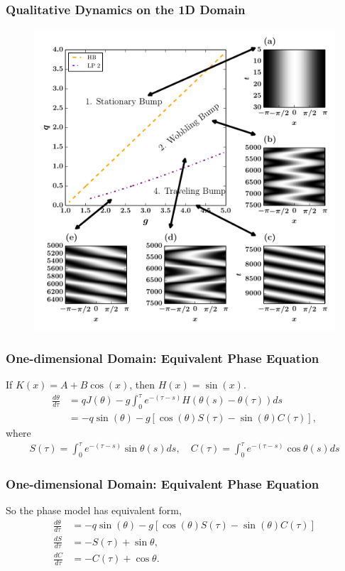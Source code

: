 \documentclass{beamer}
\begin{document}
\begin{frame}
\frametitle{Qualitative Dynamics on the 1D Domain}
\begin{figure}
 \includegraphics[width=.7\textwidth]{oned_full_2par5.pdf}
\end{figure}
\end{frame}

\begin{frame}
\frametitle{One-dimensional Domain: Equivalent Phase Equation}
If $K(x) = A+B\cos(x)$, then $H(x) = \sin(x)$.
\begin{align*}
\frac{d\theta}{d\tau} &= qJ(\theta) -g\int_0^\tau e^{-(\tau-s)} H(\theta(s)-\theta(\tau))ds\\
&= -q\sin(\theta) -g [\cos(\theta)S(\tau) - \sin(\theta)C(\tau)],
\end{align*}
where
\begin{align*}
 S(\tau) = \int_0^\tau e^{-(\tau-s)} \sin\theta(s)ds, \quad C(\tau) = \int_0^\tau e^{-(\tau-s)} \cos\theta(s)ds
\end{align*}
\end{frame}

\begin{frame}
\frametitle{One-dimensional Domain: Equivalent Phase Equation}
So the phase model has equivalent form,
\begin{equation*}
\begin{split}
 \frac{d\theta}{d\tau} &= - q\sin(\theta) - g[\cos(\theta) S(\tau) - \sin(\theta) C(\tau)]\\
 \frac{dS}{d\tau} &= -S(\tau) + \sin\theta,\\
 \frac{dC}{d\tau} &= -C(\tau) + \cos\theta.
\end{split}
\end{equation*}
\end{frame}
\end{document}
